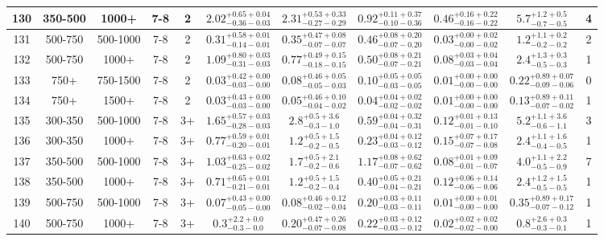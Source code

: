 \documentclass[11pt, oneside]{article}
\begin{document}
\begin{table}
{\begin{tabular}{ |c|c|c|c|c||c|c|c|c||c|c| }
130 & 350-500 & 1000+ & 7-8 & 2 & $2.02^{+0.65+0.04}_{-0.36-0.03}$ & $2.31^{+0.53+0.33}_{-0.27-0.29}$ & $0.92^{+0.11+0.37}_{-0.10-0.36}$ & $0.46^{+0.16+0.22}_{-0.16-0.22}$ & $5.7^{+1.2+0.5}_{-0.7-0.5}$ & 4 \\ \hline
131 & 500-750 & 500-1000 & 7-8 & 2 & $0.31^{+0.58+0.01}_{-0.14-0.01}$ & $0.35^{+0.47+0.08}_{-0.07-0.07}$ & $0.46^{+0.08+0.20}_{-0.07-0.20}$ & $0.03^{+0.00+0.02}_{-0.00-0.02}$ & $1.2^{+1.1+0.2}_{-0.2-0.2}$ & 2 \\ \hline
132 & 500-750 & 1000+ & 7-8 & 2 & $1.09^{+0.80+0.03}_{-0.31-0.03}$ & $0.77^{+0.49+0.15}_{-0.18-0.15}$ & $0.50^{+0.08+0.21}_{-0.07-0.21}$ & $0.08^{+0.03+0.04}_{-0.03-0.04}$ & $2.4^{+1.3+0.3}_{-0.5-0.3}$ & 1 \\ \hline
133 & 750+ & 750-1500 & 7-8 & 2 & $0.03^{+0.42+0.00}_{-0.03-0.00}$ & $0.08^{+0.46+0.05}_{-0.05-0.03}$ & $0.10^{+0.05+0.05}_{-0.03-0.05}$ & $0.01^{+0.00+0.00}_{-0.00-0.00}$ & $0.22^{+0.89+0.07}_{-0.09-0.06}$ & 0 \\ \hline
134 & 750+ & 1500+ & 7-8 & 2 & $0.03^{+0.43+0.00}_{-0.03-0.00}$ & $0.05^{+0.46+0.10}_{-0.04-0.02}$ & $0.04^{+0.04+0.02}_{-0.02-0.02}$ & $0.01^{+0.00+0.00}_{-0.00-0.00}$ & $0.13^{+0.89+0.11}_{-0.07-0.02}$ & 1 \\ \hline
135 & 300-350 & 500-1000 & 7-8 & 3+ & $1.65^{+0.57+0.03}_{-0.28-0.03}$ & $2.8^{+0.5+3.6}_{-0.3-1.0}$ & $0.59^{+0.04+0.32}_{-0.04-0.31}$ & $0.12^{+0.01+0.13}_{-0.01-0.10}$ & $5.2^{+1.1+3.6}_{-0.6-1.1}$ & 3 \\ \hline
136 & 300-350 & 1000+ & 7-8 & 3+ & $0.77^{+0.59+0.01}_{-0.20-0.01}$ & $1.2^{+0.5+1.5}_{-0.2-0.5}$ & $0.23^{+0.04+0.12}_{-0.03-0.12}$ & $0.15^{+0.07+0.17}_{-0.07-0.08}$ & $2.4^{+1.1+1.6}_{-0.4-0.5}$ & 1 \\ \hline
137 & 350-500 & 500-1000 & 7-8 & 3+ & $1.03^{+0.63+0.02}_{-0.25-0.02}$ & $1.7^{+0.5+2.1}_{-0.2-0.6}$ & $1.17^{+0.08+0.62}_{-0.07-0.62}$ & $0.08^{+0.01+0.09}_{-0.01-0.07}$ & $4.0^{+1.1+2.2}_{-0.5-0.9}$ & 7 \\ \hline
138 & 350-500 & 1000+ & 7-8 & 3+ & $0.71^{+0.65+0.01}_{-0.21-0.01}$ & $1.2^{+0.5+1.5}_{-0.2-0.4}$ & $0.40^{+0.05+0.21}_{-0.04-0.21}$ & $0.12^{+0.06+0.14}_{-0.06-0.06}$ & $2.4^{+1.2+1.5}_{-0.5-0.5}$ & 1 \\ \hline
139 & 500-750 & 500-1000 & 7-8 & 3+ & $0.07^{+0.43+0.00}_{-0.05-0.00}$ & $0.08^{+0.46+0.12}_{-0.02-0.04}$ & $0.20^{+0.03+0.11}_{-0.03-0.11}$ & $0.01^{+0.00+0.01}_{-0.00-0.00}$ & $0.35^{+0.89+0.17}_{-0.07-0.12}$ & 1 \\ \hline
140 & 500-750 & 1000+ & 7-8 & 3+ & $0.3^{+2.2+0.0}_{-0.3-0.0}$ & $0.20^{+0.47+0.26}_{-0.07-0.08}$ & $0.22^{+0.03+0.12}_{-0.03-0.12}$ & $0.02^{+0.02+0.02}_{-0.02-0.00}$ & $0.8^{+2.6+0.3}_{-0.3-0.1}$ & 1 \\ \hline

\end{tabular}}
\end{table}
\end{document}
